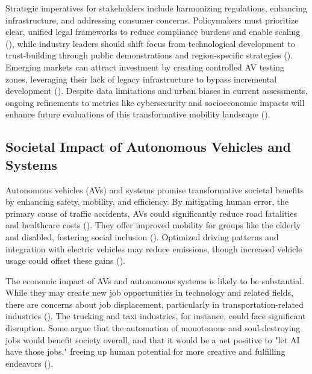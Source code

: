 Strategic imperatives for stakeholders include harmonizing regulations, enhancing infrastructure, and addressing consumer concerns. Policymakers must prioritize clear, unified legal frameworks to reduce compliance burdens and enable scaling (\cite{NCSL2025}), while industry leaders should shift focus from technological development to trust-building through public demonstrations and region-specific strategies (\cite{Deloitte2025}). Emerging markets can attract investment by creating controlled AV testing zones, leveraging their lack of legacy infrastructure to bypass incremental development (\cite{DubaiLaw2023}). Despite data limitations and urban biases in current assessments, ongoing refinements to metrics like cybersecurity and socioeconomic impacts will enhance future evaluations of this transformative mobility landscape (\cite{KPMG2018}).

\subsection{Societal Impact of Autonomous Vehicles and Systems}

Autonomous vehicles (AVs) and systems promise transformative societal benefits by enhancing safety, mobility, and efficiency. By mitigating human error, the primary cause of traffic accidents, AVs could significantly reduce road fatalities and healthcare costs (\cite{Fagnant2015}). They offer improved mobility for groups like the elderly and disabled, fostering social inclusion (\cite{Harper2016}). Optimized driving patterns and integration with electric vehicles may reduce emissions, though increased vehicle usage could offset these gains (\cite{Greenblatt2015}).

The economic impact of AVs and autonomous systems is likely to be substantial. While they may create new job opportunities in technology and related fields, there are concerns about job displacement, particularly in transportation-related industries (\cite{Autor2015}). The trucking and taxi industries, for instance, could face significant disruption. Some argue that the automation of monotonous and soul-destroying jobs would benefit society overall, and that it would be a net positive to "let AI have those jobs," freeing up human potential for more creative and fulfilling endeavors (\cite{Picone2025}).


